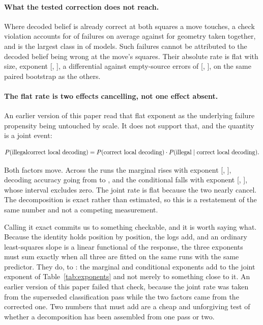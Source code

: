 \documentclass[11pt]{article}
\begin{document}
\paragraph{What the tested correction does not reach.}
Where decoded belief is already correct at both squares a move touches, a check
violation accounts for  of failures on average against
 for geometry taken together, and is the largest class in
 of  models. Such failures cannot be attributed
to the decoded belief being wrong at the move's squares. Their absolute rate is
flat with size, exponent  [, ], a differential
against empty-source errors of  [,
], on the same paired bootstrap as the others.

\paragraph{The flat rate is two effects cancelling, not one effect absent.}
An earlier version of this paper read that flat exponent as the underlying failure
propensity being untouched by scale. It does not support that, and the quantity is
a joint event:

\begin{equation*}
P(\text{illegal} \\ \text{correct local decoding}) = P(\text{correct local decoding}) \cdot P(\text{illegal} \mid \text{correct local decoding}).
\end{equation*}

Both factors move. Across the  runs the marginal rises with exponent
 [, ], decoding accuracy going from  to ,
and the conditional falls with exponent  [, ], whose interval
excludes zero. The joint rate is flat because the two nearly cancel. The
decomposition is exact rather than estimated, so this is a restatement of the same
number and not a competing measurement.

Calling it exact commits us to something checkable, and it is worth saying what.
Because the identity holds position by position, the logs add, and an ordinary
least-squares slope is a linear functional of the response, the three exponents
must sum exactly when all three are fitted on the same runs with the same
predictor. They do, to : the marginal and conditional exponents
add to the joint exponent of Table~\ref{tab:exponents} and not merely to something
close to it. An earlier version of this paper failed that check, because the joint
rate was taken from the superseded classification pass while the two factors came
from the corrected one. Two numbers that must add are a cheap and unforgiving test
of whether a decomposition has been assembled from one pass or two.
\end{document}

